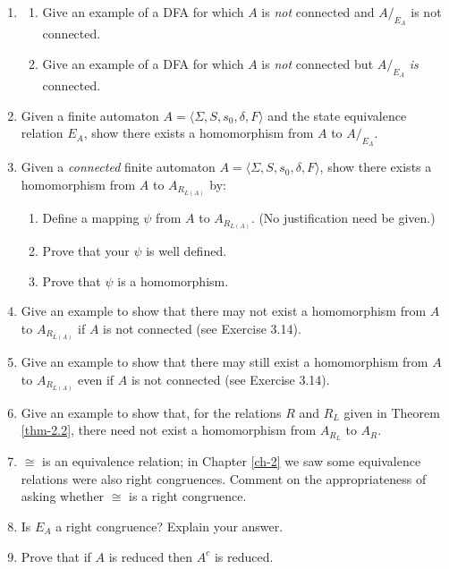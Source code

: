 \begin{enumerate}[{3.}1. ]
\item \begin{enumerate}
\item Give an example of a DFA for which $A$ is \emph{not} connected and
$A/_{E_A}$ is not connected.
\item Give an example of a DFA for which $A$ is \emph{not} connected but
$A/_{E_A}$ \emph{is} connected.
\end{enumerate}

\item Given a finite automaton $A=\langle\Sigma,S,s_0,\delta,F\rangle$ and the
state equivalence relation $E_A$, show there exists a homomorphism from $A$ to
$A/_{E_A}$.

\item Given a \emph{connected} finite automaton
$A=\langle\Sigma,S,s_0,\delta,F\rangle$, show there exists a homomorphism from
$A$ to $A_{R_{L(A)}}$ by:
\begin{enumerate}
\item Define a mapping $\psi$ from $A$ to $A_{R_{L(A)}}$. (No justification need
be given.)
\item Prove that your $\psi$ is well defined.
\item Prove that $\psi$ is a homomorphism.
\end{enumerate}

\item Give an example to show that there may not exist a homomorphism from $A$
to $A_{R_{L(A)}}$ if $A$ is not connected (see Exercise 3.14).

\item Give an example to show that there may still exist a homomorphism from $A$
to $A_{R_{L(A)}}$ even if $A$ is not connected (see Exercise 3.14).

\item Give an example to show that, for the relations $R$ and $R_L$ given in
Theorem \ref{thm-2.2}, there need not exist a homomorphism from $A_{R_L}$ to $A_R$.

\item $\cong$ is an equivalence relation; in Chapter \ref{ch-2} we saw some equivalence relations
were also right congruences. Comment on the appropriateness of asking whether
$\cong$ is a right congruence.

\item Is $E_A$ a right congruence? Explain your answer.

\item Prove that if $A$ is reduced then $A^c$ is reduced.


\end{enumerate}
